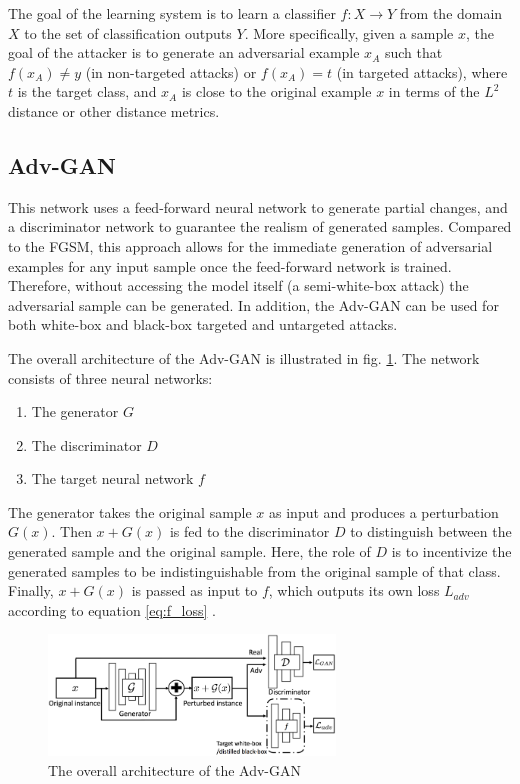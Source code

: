 \documentclass[lettersize,journal]{IEEEtran}
\begin{document}
The goal of the learning system is to learn a classifier $f: X \rightarrow Y$ from the domain $X$ to the set of classification outputs $Y$. More specifically, given a sample $x$, the goal of the attacker is to generate an adversarial example $x_A$ such that $f(x_A) \neq y$ (in non-targeted attacks) or $f(x_A) = t$ (in targeted attacks), where $t$ is the target class, and $x_A$ is close to the original example $x$ in terms of the $L^2$ distance or other distance metrics.

\subsection*{Adv-GAN}
This network uses a feed-forward neural network to generate partial changes, and a discriminator network to guarantee the realism of generated samples. Compared to the FGSM, this approach allows for the immediate generation of adversarial examples for any input sample once the feed-forward network is trained. Therefore, without accessing the model itself (a semi-white-box attack) the adversarial sample can be generated. In addition, the Adv-GAN can be used for both white-box and black-box targeted and untargeted attacks.

The overall architecture of the Adv-GAN is illustrated in fig. \ref{advgan_arch}. The network consists of three neural networks:
\begin{enumerate}
\item The generator $G$
\item The discriminator $D$
\item The target neural network $f$
\end{enumerate}
The generator takes the original sample $x$ as input and produces a perturbation $G(x)$. Then $x + G(x)$ is fed to the discriminator $D$ to distinguish between the generated sample and the original sample. Here, the role of $D$ is to incentivize the generated samples to be indistinguishable from the original sample of that class. Finally, $x + G(x)$ is passed as input to $f$, which outputs its own loss $L_{adv}$ according to equation \ref{eq:f_loss} \cite{Xiao2018GeneratingAE}.

\begin{figure}[!t]
\centering
\includegraphics[width=3in]{advgan_arch.PNG}
\caption{The overall architecture of the Adv-GAN \cite{Xiao2018GeneratingAE}}
\label{advgan_arch}
\end{figure}
\end{document}
